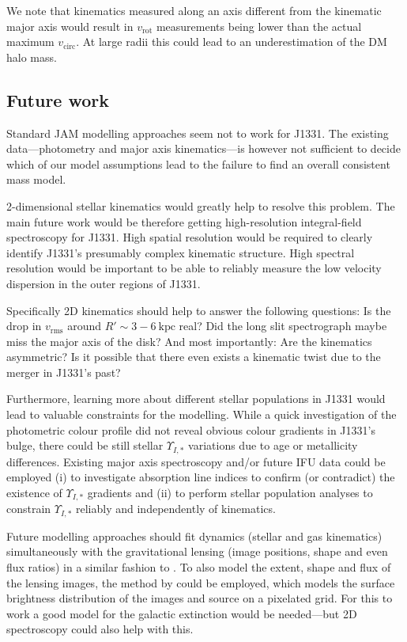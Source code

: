\documentclass[useAMS,usenatbib]{mnras}
\begin{document}
We note that kinematics measured along an axis different from the kinematic major axis would result in $v_\text{rot}$ measurements being lower than the actual maximum $v_\text{circ}$. At large radii this could lead to an underestimation of the DM halo mass.

\subsection{Future work}

Standard JAM modelling approaches seem not to work for J1331. The existing data---photometry and major axis kinematics---is however not sufficient to decide which of our model assumptions lead to the failure to find an overall consistent mass model.

2-dimensional stellar kinematics would greatly help to resolve this problem. The main future work would be therefore getting high-resolution integral-field spectroscopy for J1331. High spatial resolution would be required to clearly identify J1331's presumably complex kinematic structure. High spectral resolution would be important to be able to reliably measure the low velocity dispersion in the outer regions of J1331.

Specifically 2D kinematics should help to answer the following questions: Is the drop in $v_\text{rms}$ around $R' \sim 3-6~\text{kpc}$ real? Did the long slit spectrograph maybe miss the major axis of the disk? And most importantly: Are the kinematics asymmetric? Is it possible that there even exists a kinematic twist due to the merger in J1331's past?

Furthermore, learning more about different stellar populations in J1331 would lead to valuable constraints for the modelling. While a quick investigation of the photometric colour profile did not reveal obvious colour gradients in J1331's bulge, there could be still stellar $\Upsilon_{I,*}$ variations due to age or metallicity differences. Existing major axis spectroscopy and/or future IFU data could be employed (i) to investigate absorption line indices to confirm (or contradict) the existence of $\Upsilon_{I,*}$ gradients and (ii) to perform stellar population analyses to constrain $\Upsilon_{I,*}$ reliably and independently of kinematics.

Future modelling approaches should fit dynamics (stellar and gas kinematics) simultaneously with the gravitational lensing (image positions, shape and even flux ratios) in a similar fashion to \citet{SWELLSIV}. To also model the extent, shape and flux of the lensing images, the method by \citet{2004ApJ...611..739T,2003ApJ...590..673W} could be employed, which models the surface brightness distribution of the images and source on a pixelated grid. For this to work a good model for the galactic extinction would be needed---but 2D spectroscopy could also help with this.
\end{document}
